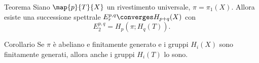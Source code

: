 \begin{frame}
\frametitle{\secname}
\begin{block}{Teorema}
Siano \(\map{p}{T}{X}\) un rivestimento universale, \(\pi=\pi_1(X)\). Allora esiste una successione spettrale \(E^{p,q}_r\converges H_{p+q}(X)\) con
\[
E^{p,q}_2=H_p(\pi;H_q(T)).
\]
\end{block}
\pause
\begin{block}{Corollario}
Se \(\pi\) è abeliano e finitamente generato e i gruppi \(H_i(X)\) sono finitamente generati, allora anche i gruppi \(H_i(T)\) lo sono.
\end{block}
\end{frame}